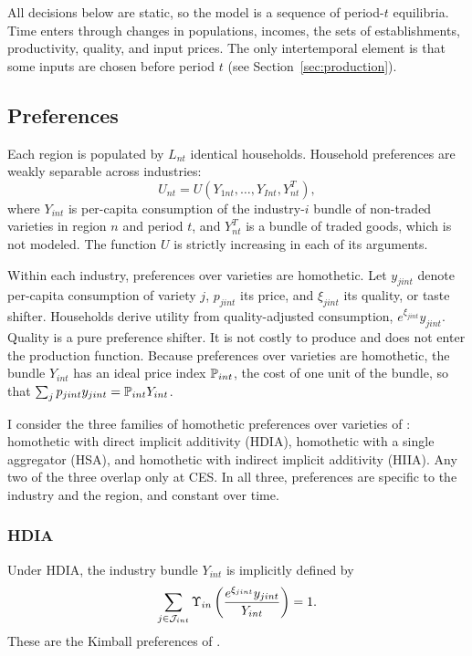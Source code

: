 All decisions below are static, so the model is a sequence of period-$t$ equilibria.
Time enters through changes in populations, incomes, the sets of establishments, productivity, quality, and input prices.
The only intertemporal element is that some inputs are chosen before period $t$ (see Section~\ref{sec:production}).

\subsection{Preferences}\label{sec:preferences}

Each region is populated by $L_{nt}$ identical households.
Household preferences are weakly separable across industries:
\begin{equation}\label{eq:uppertier}
	U_{nt} = U\left(Y_{1nt}, \dots, Y_{Int}, Y^T_{nt}\right),
\end{equation}
where $Y_{int}$ is per-capita consumption of the industry-$i$ bundle of non-traded varieties in region $n$ and period $t$, and $Y^T_{nt}$ is a bundle of traded goods, which is not modeled.
The function $U$ is strictly increasing in each of its arguments.

Within each industry, preferences over varieties are homothetic.
Let $y_{jint}$ denote per-capita consumption of variety $j$, $p_{jint}$ its price, and $\xi_{jint}$ its quality, or taste shifter.
Households derive utility from quality-adjusted consumption, $e^{\xi_{jint}} y_{jint}$.
Quality is a pure preference shifter.
It is not costly to produce and does not enter the production function.
Because preferences over varieties are homothetic, the bundle $Y_{int}$ has an ideal price index $\P_{int}$, the cost of one unit of the bundle, so that $\sum_{j} p_{jint} y_{jint} = \P_{int} Y_{int}$.

I consider the three families of homothetic preferences over varieties of \textcite{Matsuyama&Ushev17}: homothetic with direct implicit additivity (HDIA), homothetic with a single aggregator (HSA), and homothetic with indirect implicit additivity (HIIA).
Any two of the three overlap only at CES.
In all three, preferences are specific to the industry and the region, and constant over time.

\subsubsection{HDIA}\label{sec:hdia}

Under HDIA, the industry bundle $Y_{int}$ is implicitly defined by
\begin{equation}\label{eq:hdia}
	\sum_{j \in \cJ_{int}} \Upsilon_{in}\left(\frac{e^{\xi_{jint}} y_{jint}}{Y_{int}}\right) = 1.
\end{equation}
These are the Kimball preferences of \textcite{Kimball95}.

